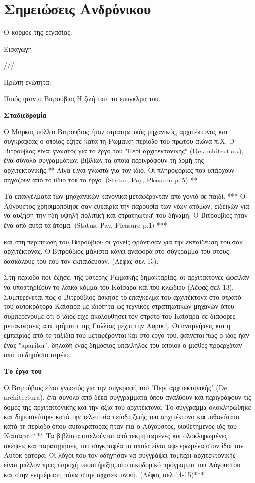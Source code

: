 
\section{Σημειώσεις Ανδρόνικου}

Ο κορμός της εργασίας:

Εισαγωγή

///

Πρώτη ενώτητα:

Ποιός ήταν ο Βιτρούβιος;Η ζωή του, το επάγκλμα του.

\textbf{Σταδιοδρομία}

Ο Μάρκος πόλλιο Βιτρούβιος ήταν στρατηωτικός μηχανικός, αρχιτέκτονας και
συγκραφέας ο οποίος έζησε κατά τη Ρωμαική περίοδο του πρώτου αιώνα π.Χ. Ο
Βιτρούβιος είναι γνωστός για το έργο του "Περί αρχιτεκτονικής" (De
architectura), ένα σύνολο συγραμμάτων, βιβλίων τα οποία περιγράφουν τη δομή της
αρχιτεκτονικής.** Λίγα είναι γνωστά για τον ίδιο. Οι πληροφορίες που υπάρχουν
πηγάζουν από το ιίδιο του το έργο. (Status, Pay, Pleasure p. 5) **

Τα επαγγέλματα των μηαχανικών κανονικά μεταφέρονταν από γονιό σε παιδί.  *** 
 Ο
Αύγουστος χρησιμοποίησε σαν ευκαιρία την παρουσία των νέων ατόμων, ειδεικών για
να αυξήση την ήδη υψηλή πολιτική και στρατηωτική του δήναμη. Ο Βιτρούβιος ήταν
ένα από αυτά τα άτομα. (Status, Pay, Pleasure p.1) ***

και στη περίπτωση του Βιτρούβιου οι γονείς φρόντισαν για την εκπαίδευση του σαν
αρχιτέκτονας. Ο Βιτρούβιος μάλιστα κάνει αναφορά στο σύγκραμμα του στους
δασκάλους του που τον εκπαίδευσαν. (Λέφας σελ 13).

Στη περίοδο που έζησε, της ύστερης Ρωμαικής δημοκταρίας, οι αρχιτέκτονες ώφειλαν
να υποστηρίζουν το λαικό κόμμα του Καίσαρα και του κλώδιου (Λέφας σελ 13).
Συμπερένεται πως ο Βιτρούβιος άσκησε το επάγκελμα του αρχιτέκτονα στο στρατό του
αυτοκράτορα Καίσαρα με ιδιότητα ως τεχνικός στρατηωτικών μηχανών όπου
συμπερένουμε οτι ο ίδιος είχε ακολουθήσει τον στρατό του Καίσαρα σε διάφορες
μετακινήσεις από τμήματα της Γαλλίας μέχρι την Αφρική. Οι αναμνήσεις και η
εμπειρίας από τα ταξίδια του μεταφέρονται και στο έργο του. φαίνεται πως ο ίδος
ήαν ένας "aparitor", δηλαδή ένας δημόσιος υπάλληλος του οποίου ο μισθός
προερχόταν από το δημόσιο ταμέιο.

\textbf{Το έργο του}

Ο Βιτρούβιος είναι γνωστός για την συγκραφή του "Περί αρχιτεκτονικής" (De
architectura), ένα σύνολο από δέκα συγγράμματα όπου αναλύουν και περιγράφουν τις
δομές της αρχιτεκτονικής και την αξία του αρχιτέκτονα.
 Το σύγγραμμα
ολοκληρώθηκε και δημοσιεύτηκε κατά την τελευταία πείοδο ζωής του αρχιτέκτονα και
πιθανότατα κατά τη περίοδο όπου αυτοκράτορας ήταν πια ο Αύγουστος, υιοθετημένος
ιός του Καίσαρα. ***
 Τα βιβλία αποτελούνται από τεκμητιωμένες και ολοκληρωμένες
σκέψεις και παρατηρήσεις του συγκραφέα τα οποία είναι αφειερωμένα στον ίδιο τον
Αυτοκ΄ρατορα. Οι λόγοι που τον οδήγησαν να συγγράψει τομπερι αρχιτεκτονικής
είναι μάλλον προς παροχή υποστήριξης στο οικοδομικό πρόγραμμα του Αύγουστου και
στην ενημέρωση πάνω στην αρχιτεκτονική. (Λέφας σελ 14-15)***

